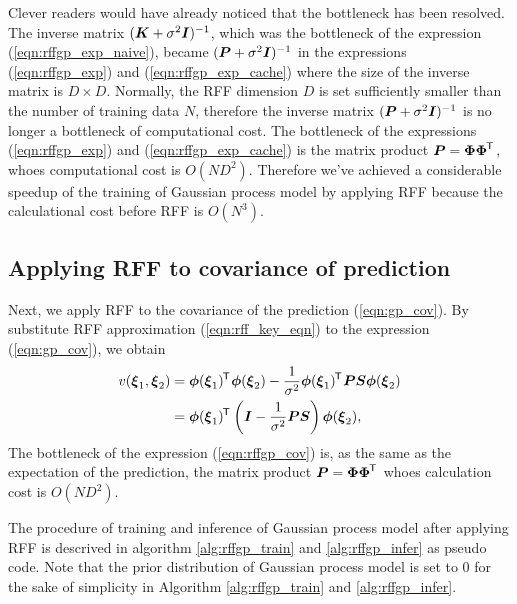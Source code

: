 \documentclass[twocolumn,a4paper,10pt]{article}
\begin{document}
Clever readers would have already noticed that the bottleneck has been resolved.
The inverse matrix $(\boldsymbol{K} + \sigma^2 \boldsymbol{I})^{-1}$, which was the bottleneck of
the expression (\ref{eqn:rffgp_exp_naive}), became $(\boldsymbol{P} + \sigma^2 \boldsymbol{I})^{-1}$
in the expressions (\ref{eqn:rffgp_exp}) and (\ref{eqn:rffgp_exp_cache}) where the size of
the inverse matrix is $D \times D$. Normally, the RFF dimension $D$ is set sufficiently
smaller than the number of training data $N$, therefore the inverse matrix
$(\boldsymbol{P} + \sigma^2 \boldsymbol{I})^{-1}$ is no longer a bottleneck of computational cost.
The bottleneck of the expressions (\ref{eqn:rffgp_exp}) and (\ref{eqn:rffgp_exp_cache})
is the matrix product $\boldsymbol{P} = \boldsymbol{\Phi \Phi}^{\mkern-1.5mu\mathsf{T}}\hspace{0.5pt}$, whoes computational cost is $O(ND^2)$.
Therefore we've achieved a considerable speedup of the training of Gaussian process model
by applying RFF because the calculational cost before RFF is $O(N^3)$.

\subsection{Applying RFF to covariance of prediction}

Next, we apply RFF to the covariance of the prediction (\ref{eqn:gp_cov}).
By substitute RFF approximation (\ref{eqn:rff_key_eqn}) to the expression (\ref{eqn:gp_cov}),
we obtain
\begin{align}
    v (\boldsymbol{\xi}_1, \boldsymbol{\xi}_2)
    & = \boldsymbol{\phi} (\boldsymbol{\xi}_1)^{\mkern-1.5mu\mathsf{T}}\hspace{0.5pt} \boldsymbol{\phi} (\boldsymbol{\xi}_2)
    - \frac{1}{\sigma^2} \boldsymbol{\phi} (\boldsymbol{\xi}_1)^{\mkern-1.5mu\mathsf{T}}\hspace{0.5pt} \boldsymbol{PS} \boldsymbol{\phi} (\boldsymbol{\xi}_2) \notag \\
    & = \boldsymbol{\phi} (\boldsymbol{\xi}_1)^{\mkern-1.5mu\mathsf{T}}\hspace{0.5pt}
    \left( \boldsymbol{I} - \frac{1}{\sigma^2} \boldsymbol{PS} \right)
    \boldsymbol{\phi} (\boldsymbol{\xi}_2),
    \label{eqn:rffgp_cov}
\end{align}
The bottleneck of the expression (\ref{eqn:rffgp_cov}) is, as the same as the expectation of the
prediction, the matrix product $\boldsymbol{P} = \boldsymbol{\Phi \Phi}^{\mkern-1.5mu\mathsf{T}}\hspace{0.5pt}$ whoes calculation cost is $O(ND^2)$.

The procedure of training and inference of Gaussian process model after applying RFF is
descrived in algorithm \ref{alg:rffgp_train} and \ref{alg:rffgp_infer} as pseudo code.
Note that the prior distribution of Gaussian process model is set to 0 for the sake of
simplicity in Algorithm \ref{alg:rffgp_train} and \ref{alg:rffgp_infer}.
\end{document}
